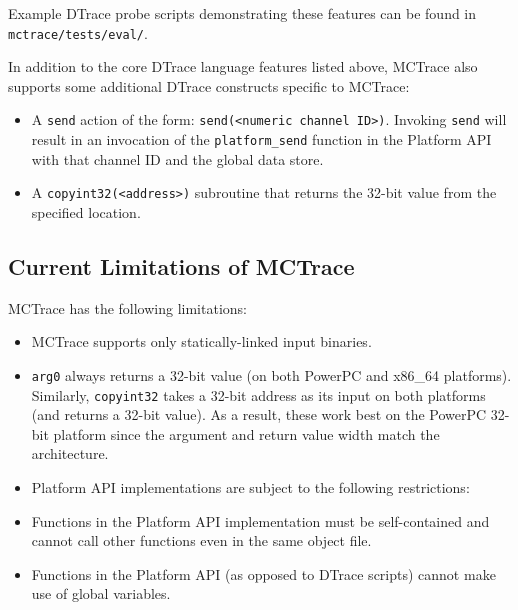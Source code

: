 Example DTrace probe scripts demonstrating these features can be
found in \texttt{mctrace/tests/eval/}.

In addition to the core DTrace language features listed above,
   MCTrace also supports some additional DTrace constructs specific to
   MCTrace:
   \begin{itemize}
   \item  A \texttt{send} action of the form: \texttt{send(<numeric channel ID>)}. Invoking
     \texttt{send} will result in an invocation of the \texttt{platform\_send} function
     in the Platform API with that channel ID and the global data store.
   \item A \texttt{copyint32(<address>)} subroutine that returns the 32-bit value
     from the specified location.
   \end{itemize}
   
\subsection{Current Limitations of MCTrace}
\label{sec:curr-limit-mctr}

MCTrace has the following limitations:
\begin{itemize}
\item MCTrace supports only statically-linked input binaries.
\item \texttt{arg0} always returns a 32-bit value
   (on both PowerPC and x86\_64 platforms). Similarly, \texttt{copyint32}
   takes a 32-bit address as its input on both platforms (and returns
   a 32-bit value). As a result, these work best on the PowerPC 32-bit
   platform since the argument and return value width match the
   architecture.
 \item Platform API implementations are subject to the following
   restrictions:
 \item Functions in the Platform API implementation must be self-contained
     and cannot call other functions even in the same object file.
   \item Functions in the Platform API (as opposed to DTrace scripts)
     cannot make use of global variables. 
   \end{itemize}
   
